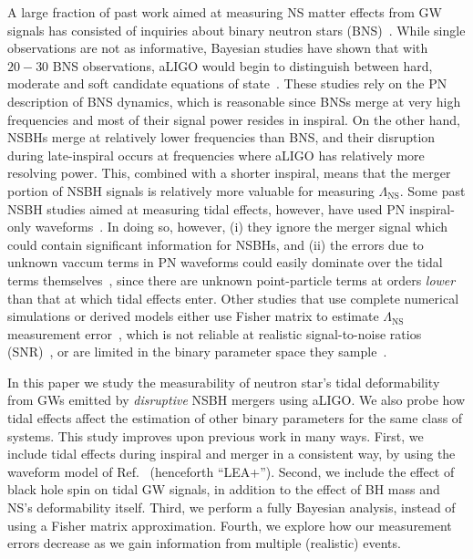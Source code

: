 \documentclass[aps,prd,amsmath,floats,floatfix, twocolumn,
superscriptaddress,nofootinbib,showpacs]{revtex4-1}
\newcommand{\lambdans}{\Lambda_\mathrm{NS}}
\begin{document}
A large fraction of past work aimed at measuring NS matter effects from GW
signals has consisted of inquiries about binary neutron stars (BNS)~\cite{
Lee1999a,Lee1999b,Lee2000,oechslin:07,Read:2008iy,Markakis:2010mp,Markakis:2011vd,
stergioulas:11,East:2011xa,Lackey2014,Wade:2014vqa,Bauswein:2014qla}. While single 
observations are not as informative, Bayesian studies have shown that with
$20-30$ BNS observations, aLIGO would begin to distinguish between hard,
moderate and soft candidate equations of state~\cite{DelPozzo:13,
Chatziioannou:2015uea,Agathos:2015a}. These studies rely on the PN 
description of BNS dynamics, which is reasonable since BNSs merge at very high
frequencies and most of their signal power resides in inspiral.
% 
On the other hand, NSBHs merge at relatively lower frequencies than BNS, 
and their disruption during late-inspiral occurs at frequencies where aLIGO
has relatively more resolving power. This, combined with a shorter inspiral,
means that the merger portion of NSBH signals is relatively more valuable for
measuring $\lambdans$. Some past NSBH studies aimed at measuring tidal effects,
however, have used PN inspiral-only waveforms~\cite{Maselli:2013rza}. In doing
so, however, (i) they ignore the merger signal which could contain significant
information for NSBHs, and (ii) the errors due to unknown vaccum terms in PN 
waveforms could easily dominate over the tidal terms 
themselves~\cite{Yagi:2014}, since there are unknown point-particle terms at 
orders {\it lower} than that at which tidal effects enter. Other studies that
use complete numerical simulations or derived models either use Fisher matrix 
to estimate $\lambdans$ measurement error~\cite{Lackey2011,Lackey:2013axa},
which is not reliable at realistic signal-to-noise ratios 
(SNR)~\cite{Vallisneri:2007ev}, or are limited in the binary parameter space
they sample~\cite{Foucart:2013psa}.


In this paper we study the measurability of neutron star's tidal deformability
from GWs emitted by {\it disruptive} NSBH mergers using aLIGO. We also probe how tidal 
effects affect the estimation of other binary parameters for the same class
of systems. This study improves upon previous work in many ways. First, we
include tidal effects during inspiral and merger in a consistent way, by using
the waveform model of Ref.~\cite{Lackey:2013axa} (henceforth ``LEA+''). Second,
we include the effect
of black hole spin on tidal GW signals, in addition to the effect of BH mass 
and NS's deformability itself. Third, we perform a fully Bayesian 
analysis, instead of using a Fisher matrix approximation. Fourth, we explore 
how our measurement errors decrease as we gain information from multiple 
(realistic) events.
\end{document}
